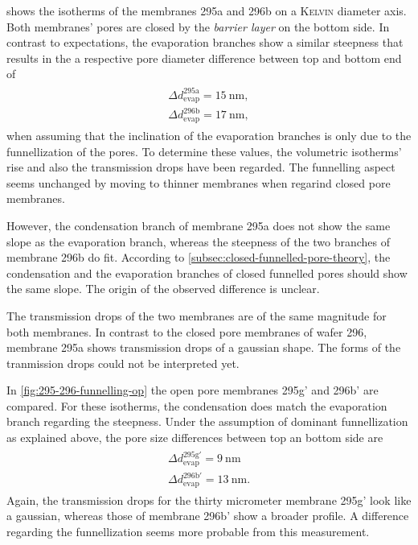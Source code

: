 \documentclass[../thesis.tex]{subfiles}
\begin{document}
    

     shows the isotherms  of the membranes 295a and 296b on a \textsc{Kelvin} diameter axis. Both membranes' pores are closed by the \textit{barrier layer} on the bottom side. In contrast to expectations, the evaporation branches show a similar steepness that results in the a respective pore diameter difference between top and bottom end of
    \begin{align}
      \begin{split}
        \Delta d_\mathrm{evap}^\mathrm{295a}=\SI{15}{\nano\meter}, \\
        \Delta d_\mathrm{evap}^\mathrm{296b}=\SI{17}{\nano\meter},
      \end{split}
    \end{align}
    when assuming that the inclination of the evaporation branches is only due to the funnellization of the pores. To determine these values, the volumetric isotherms' rise and also the transmission drops have been regarded. The funnelling aspect seems unchanged by moving to thinner membranes when regarind closed pore membranes.

    However, the condensation branch of membrane 295a does not show the same slope as the evaporation branch, whereas the steepness of the two branches of membrane 296b do fit. According to \cref{subsec:closed-funnelled-pore-theory}, the condensation and the evaporation branches of closed funnelled pores should show the same slope. The origin of the observed difference is unclear.

    The transmission drops of the two membranes are of the same magnitude for both membranes. In contrast to the closed pore membranes of wafer 296, membrane 295a shows transmission drops of a gaussian shape. The forms of the tranmission drops could not be interpreted yet.
    \medskip

    In \cref{fig:295-296-funnelling-op} the open pore membranes 295g' and 296b' are compared. For these isotherms, the condensation does match the evaporation branch regarding the steepness.  Under the assumption of dominant funnellization as explained above, the pore size differences between top an bottom side are
    \begin{align}
      \begin{split}
        \Delta d_\mathrm{evap}^\mathrm{295g'}=\SI{9}{\nano\meter} \\
        \Delta d_\mathrm{evap}^\mathrm{296b'}=\SI{13}{\nano\meter}.
      \end{split}
    \end{align}
    Again, the transmission drops for the thirty micrometer membrane 295g' look like a gaussian, whereas those of membrane 296b' show a broader profile. A difference regarding the funnellization seems more probable from this measurement.
\end{document}

